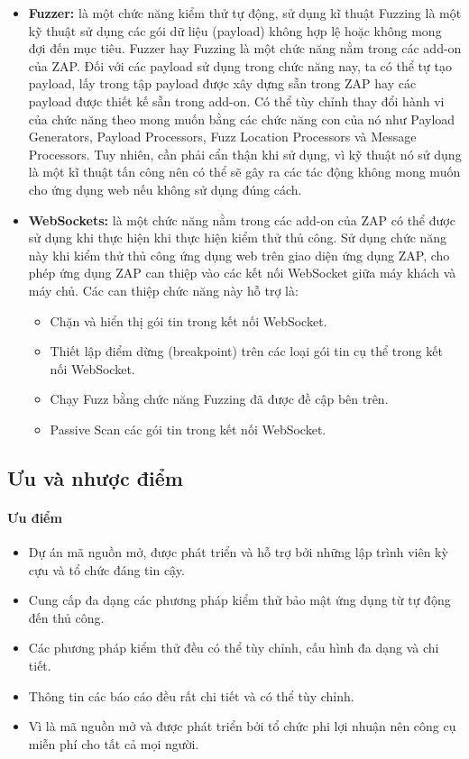 \begin{itemize}
  \item \textbf{Fuzzer:} là một chức năng kiểm thử tự động, sử dụng kĩ thuật Fuzzing là một kỹ thuật sử dụng các gói dữ liệu (payload) không hợp lệ hoặc không mong đợi đến mục tiêu. Fuzzer hay Fuzzing là một chức năng nằm trong các add-on của ZAP. Đối với các payload sử dụng trong chức năng nay, ta có thể tự tạo payload, lấy trong tập payload được xây dựng sẵn trong ZAP hay các payload được thiết kế sẵn trong add-on. Có thể tùy chỉnh thay đổi hành vi của chức năng theo mong muốn bằng các chức năng con của nó như Payload Generators, Payload Processors, Fuzz Location Processors và Message Processors. Tuy nhiên, cần phải cẩn thận khi sử dụng, vì kỹ thuật nó sử dụng là một kĩ thuật tấn công nên có thể sẽ gây ra các tác động không mong muốn cho ứng dụng web nếu không sử dụng đúng cách.
  \item \textbf{WebSockets:} là một chức năng nằm trong các add-on của ZAP có thể được sử dụng khi thực hiện khi thực hiện kiểm thử thủ công. Sử dụng chức năng này khi kiểm thử thủ công ứng dụng web trên giao diện ứng dụng ZAP, cho phép ứng dụng ZAP can thiệp vào các kết nối WebSocket giữa máy khách và máy chủ. Các can thiệp chức năng này hỗ trợ là:
  \begin{itemize}
    \item Chặn và hiển thị gói tin trong kết nối WebSocket.
    \item Thiết lập điểm dừng (breakpoint) trên các loại gói tin cụ thể trong kết nối WebSocket.
    \item Chạy Fuzz bằng chức năng Fuzzing đã được đề cập bên trên. 
    \item Passive Scan các gói tin trong kết nối WebSocket.
  \end{itemize}
\end{itemize}

\subsection{Ưu và nhược điểm}

\paragraph{Ưu điểm}
\begin{itemize}
  \item Dự án mã nguồn mở, được phát triển và hỗ trợ bởi những lập trình viên kỳ cựu và tổ chức đáng tin cậy.
  \item Cung cấp đa dạng các phương pháp kiểm thử bảo mật ứng dụng từ tự động đến thủ công.
  \item Các phương pháp kiểm thử đều có thể tùy chỉnh, cấu hình đa dạng và chi tiết.
  \item Thông tin các báo cáo đều rất chi tiết và có thể tùy chỉnh.
  \item Vì là mã nguồn mở và được phát triển bởi tổ chức phi lợi nhuận nên công cụ miễn phí cho tất cả mọi người.
\end{itemize}

